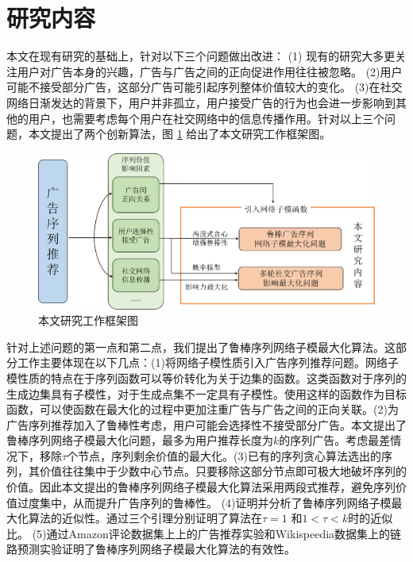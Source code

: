 \section{研究内容}

本文在现有研究的基础上，针对以下三个问题做出改进：
(1) 现有的研究大多更关注用户对广告本身的兴趣，广告与广告之间的正向促进作用往往被忽略。
(2)用户可能不接受部分广告，这部分广告可能引起序列整体价值较大的变化。
(3)在社交网络日渐发达的背景下，用户并非孤立，用户接受广告的行为也会进一步影响到其他的用户，也需要考虑每个用户在社交网络中的信息传播作用。针对以上三个问题，本文提出了两个创新算法，图 \ref{fig:frame} 给出了本文研究工作框架图。

\begin{figure}[th]
    \centering
    \includegraphics[width=.89\linewidth]{figure/frame}
    \caption{本文研究工作框架图}
    \label{fig:frame}
\end{figure}


针对上述问题的第一点和第二点，我们提出了鲁棒序列网络子模最大化算法。这部分工作主要体现在以下几点：(1)将网络子模性质引入广告序列推荐问题。网络子模性质的特点在于序列函数可以等价转化为关于边集的函数。这类函数对于序列的生成边集具有子模性，对于生成点集不一定具有子模性。使用这样的函数作为目标函数，可以使函数在最大化的过程中更加注重广告与广告之间的正向关联。(2)为广告序列推荐加入了鲁棒性考虑，用户可能会选择性不接受部分广告。本文提出了鲁棒序列网络子模最大化问题，最多为用户推荐长度为$k$的序列广告。考虑最差情况下，移除$\tau$个节点，序列剩余价值的最大化。(3)已有的序列贪心算法\cite{tschiatschek2017selecting,mitrovic2018submodularity}选出的序列，其价值往往集中于少数中心节点。只要移除这部分节点即可极大地破坏序列的价值。因此本文提出的鲁棒序列网络子模最大化算法采用两段式推荐，避免序列价值过度集中，从而提升广告序列的鲁棒性。
(4)证明并分析了鲁棒序列网络子模最大化算法的近似性。通过三个引理分别证明了算法在$\tau = 1$ 和$1< \tau < k$时的近似比。
(5)通过Amazon评论数据集上\cite{ni2019justifying}上的广告推荐实验和Wikispeedia数据集\cite{west2009wikispeedia}上的链路预测实验证明了鲁棒序列网络子模最大化算法的有效性。

